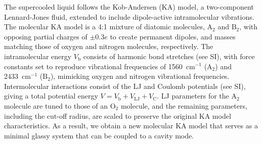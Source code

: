 \documentclass[aps, prl,
 reprint,
 superscriptaddress,
 citeautoscript,  %
 amsmath,amssymb,
 tightenlines
]{revtex4-2}
\begin{document}
The supercooled liquid follows the Kob-Andersen (KA) model,\cite{kob1995testing} a two-component Lennard-Jones fluid, extended to include dipole-active intramolecular vibrations. 
The molecular KA model is a 4:1 mixture of diatomic molecules, $\mathrm{A}_2$ and $\mathrm{B}_2$, with opposing partial charges of $\pm 0.3e$ to create permanent dipoles, and masses matching those of oxygen and nitrogen molecules, respectively. 
The intramolecular energy $V_\mathrm{b}$ consists of harmonic bond stretches (see SI), with force constants set to reproduce vibrational frequencies of 1560~cm$^{-1}$ ($\mathrm{A}_2$) and 2433~cm$^{-1}$ ($\mathrm{B}_2$), mimicking oxygen and nitrogen vibrational frequencies.\cite{wang2021accurate} 
Intermolecular interactions consist of the LJ and Coulomb potentials (see SI),\cite{kob1995testing} giving a total potential energy $V = V_\mathrm{b}+V_\mathrm{LJ}+V_\mathrm{C}$. LJ parameters for the $\mathrm{A}_2$ molecule are tuned to those of an O$_2$ molecule,\cite{wang2021accurate} and the remaining parameters, including the cut-off radius, are scaled to preserve the original KA model characteristics.
As a result, we obtain a new molecular KA model that serves as a minimal glassy system that can be coupled to a cavity mode. %
\end{document}
